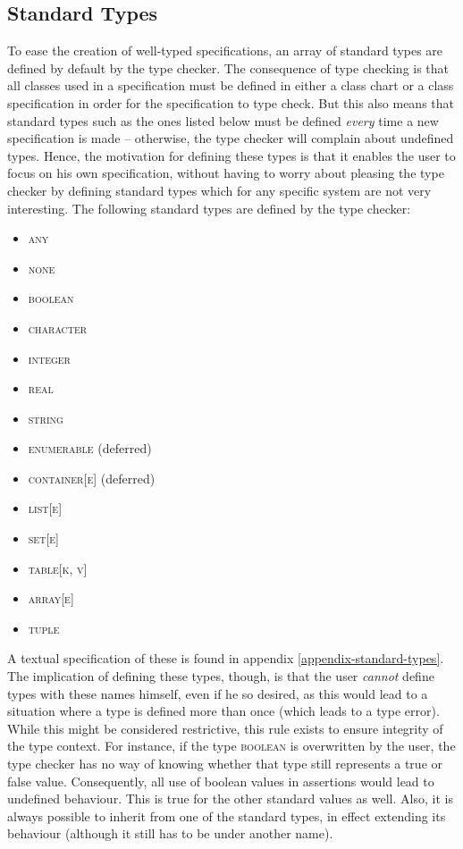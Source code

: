 \subsection{Standard Types}
\label{implementation-standard-types}
To ease the creation of well-typed specifications, an array of standard types are defined by default by the type checker. The consequence of type checking is that all classes used in a specification must be defined in either a class chart or a class specification in order for the specification to type check. But this also means that standard types such as the ones listed below must be defined \emph{every} time a new specification is made -- otherwise, the type checker will complain about undefined types. Hence, the motivation for defining these types is that it enables the user to focus on his own specification, without having to worry about pleasing the type checker by defining standard types which for any specific system are not very interesting. The following standard types are defined by the type checker:
\begin{itemize}
\item \textsc{any}
\item \textsc{none}
\item \textsc{boolean}
\item \textsc{character}
\item \textsc{integer}
\item \textsc{real}
\item \textsc{string}
\item \textsc{enumerable} (deferred)
\item \textsc{container}[\textsc{e}] (deferred)
\item \textsc{list}[\textsc{e}]
\item \textsc{set}[\textsc{e}]
\item \textsc{table}[\textsc{k}, \textsc{v}]
\item \textsc{array}[\textsc{e}]
\item \textsc{tuple}
\end{itemize}
A textual \bon{} specification of these is found in appendix \ref{appendix-standard-types}. The implication of defining these types, though, is that the user \emph{cannot} define types with these names himself, even if he so desired, as this would lead to a situation where a type is defined more than once (which leads to a type error). While this might be considered restrictive, this rule exists to ensure integrity of the type context. For instance, if the type \textsc{boolean} is overwritten by the user, the type checker has no way of knowing whether that type still represents a true or false value. Consequently, all use of boolean values in assertions would lead to undefined behaviour. This is true for the other standard values as well. Also, it is always possible to inherit from one of the standard types, in effect extending its behaviour (although it still has to be under another name).
